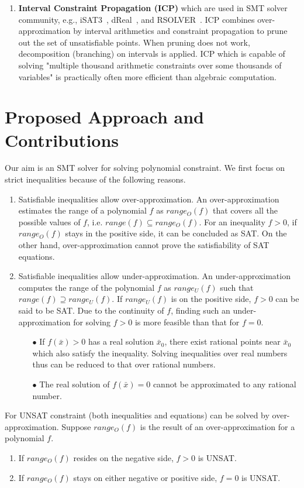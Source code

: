 \begin{enumerate}
\item \textbf{Interval Constraint Propagation (ICP)} 
which are used in SMT solver community, e.g., iSAT3~\cite{isat}, 
dReal~\cite{dRealCADE13}, and RSOLVER~\cite{rsolver}. 
ICP combines over-approximation by interval arithmetics and constraint propagation to prune out the set of unsatisfiable points. When pruning does not work, decomposition (branching) on intervals is applied. 
ICP which is capable of solving "multiple thousand arithmetic constraints over some thousands of variables" \cite{isat} is practically often more efficient than algebraic computation.
\end{enumerate}

\section{Proposed Approach and Contributions}
Our aim is an SMT solver for solving polynomial constraint. We first focus on strict inequalities because of the following reasons.
\begin{enumerate}
\item
Satisfiable inequalities allow over-approximation. An over-approximation estimates the range of a polynomial $f$ as $range_O(f)$ that covers all the possible values of $f$, i.e. $range(f) \subseteq range_O(f)$. For an inequality $f>0$, if $range_O(f)$ stays in the positive side, it can be concluded as SAT. On the other hand, over-approximation cannot prove the satisfiability of SAT equations.
\item
Satisfiable inequalities allow under-approximation. An under-approximation computes the range of the polynomial $f$ as  $range_U(f)$ such that $range(f) \supseteq range_U(f)$. If $range_U(f)$ is on the positive side, $f > 0$ can be said to be SAT. Due to the continuity of $f$, finding such an under-approximation for solving $f > 0$ is more feasible than that for $f = 0$.
\begin{itemize}
\item[$\bullet$] If $f(\bar{x}) > 0$ has a real solution $\bar{x}_0$, there exist rational points near $\bar{x}_0$ which also satisfy the inequality. Solving inequalities over real numbers thus can be reduced to that over rational numbers.
\item[$\bullet$] The real solution of $f(\bar{x}) = 0$ cannot be approximated to any rational number.
\end{itemize}
\end{enumerate}
For UNSAT constraint (both inequalities and equations) can be solved by over-approximation. Suppose $range_O(f)$ is the result of an over-approximation for a polynomial $f$.
\begin{enumerate}
\item If $range_O(f)$ resides on the negative side, $f > 0$ is UNSAT.
\item If $range_O(f)$ stays on either negative or positive side, $f = 0$ is UNSAT.
\end{enumerate}

